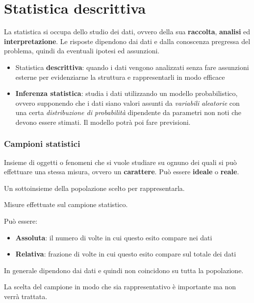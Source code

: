 \section{Statistica descrittiva}
La statistica si occupa dello studio dei dati, ovvero della sua \textbf{raccolta}, \textbf{analisi} ed \textbf{interpretazione}. Le risposte dipendono dai dati e dalla conoscenza pregressa del problema, quindi da eventuali ipotesi ed assunzioni.\\
\begin{itemize}
	\item Statistica \textbf{descrittiva}: quando i dati vengono analizzati senza fare assunzioni esterne per evidenziarne la struttura e rappresentarli in modo efficace
	\item \textbf{Inferenza statistica}: studia i dati utilizzando un modello probabilistico, ovvero supponendo che i dati siano valori assunti da \textit{variabili aleatorie} con una certa \textit{distribuzione di probabilità} dipendente da parametri non noti che devono essere stimati. Il modello potrà poi fare previsioni.
\end{itemize}

\subsubsection{Campioni statistici}
\begin{definition}[Popolazione]
	Insieme di oggetti o fenomeni che si vuole studiare su ognuno dei quali si può effettuare una stessa misura, ovvero un \textbf{carattere}. Può essere \textbf{ideale} o \textbf{reale}.
\end{definition}
\begin{definition}
	Un sottoinsieme della popolazione scelto per rappresentarla.
\end{definition}
\begin{definition}[Dati]
	Misure effettuate sul campione statistico.
\end{definition}
\begin{definition}[Frequenza]
	Può essere:
	\begin{itemize}
		\item \textbf{Assoluta}: il numero di volte in cui questo esito compare nei dati
		\item \textbf{Relativa}: frazione di volte in cui questo esito compare sul totale dei dati
	\end{itemize}
	In generale dipendono dai dati e quindi non coincidono su tutta la popolazione.
\end{definition}
\begin{note}
	La scelta del campione in modo che sia rappresentativo è importante ma non verrà trattata.
\end{note}
